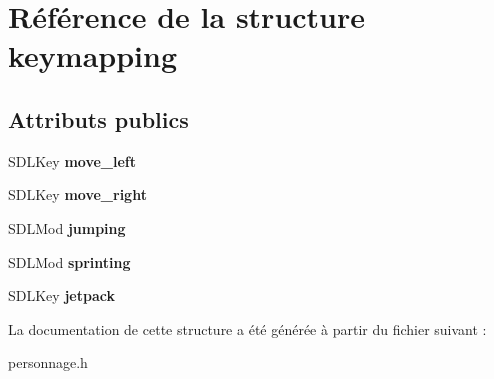\hypertarget{structkeymapping}{}\section{Référence de la structure keymapping}
\label{structkeymapping}
\subsection*{Attributs publics}
\begin{DoxyCompactItemize}
\item 
\mbox{\label{structkeymapping_a47ac41327c0b9b57937f0249d2a985cb}} 
S\+D\+L\+Key {\bfseries move\+\_\+left}
\item 
\mbox{\label{structkeymapping_a8e042c12edd4966da7cb6c6d6f9f0d0e}} 
S\+D\+L\+Key {\bfseries move\+\_\+right}
\item 
\mbox{\label{structkeymapping_a51b4adfa9a692e79e22169599bb04ebc}} 
S\+D\+L\+Mod {\bfseries jumping}
\item 
\mbox{\label{structkeymapping_a40789d738d4e8949af1098c832c6a8bb}} 
S\+D\+L\+Mod {\bfseries sprinting}
\item 
\mbox{\label{structkeymapping_a279f7eca7c930fd5c92b59e8ab37ca7f}} 
S\+D\+L\+Key {\bfseries jetpack}
\end{DoxyCompactItemize}


La documentation de cette structure a été générée à partir du fichier suivant \+:\begin{DoxyCompactItemize}
\item 
personnage.\+h\end{DoxyCompactItemize}
